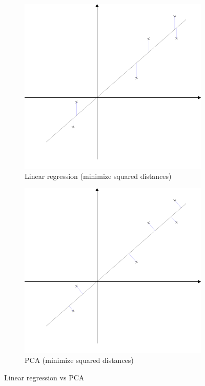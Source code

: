 \vspace{0.5cm}

\begin{figure}[htp]
	\centering
	\begin{subfigure}{.5\textwidth}
		\centering
		\includegraphics[width=.85\linewidth]{./assets/linear_regression.png}
		\caption{Linear regression (minimize squared distances)}
	\end{subfigure}%
	\begin{subfigure}{.5\textwidth}
		\centering
		\includegraphics[width=.85\linewidth]{./assets/pca.png}
		\caption{PCA (minimize squared distances)}
	\end{subfigure}
	\caption{Linear regression vs PCA}
\end{figure}


